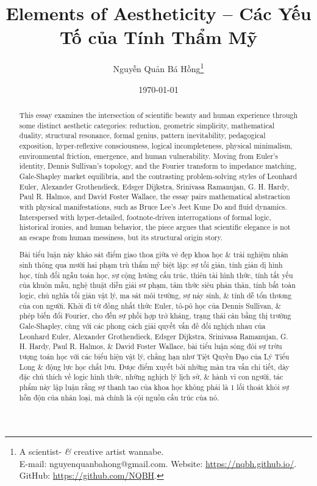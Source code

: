 \documentclass[11pt]{article}
\title{Elements of Aestheticity -- Các Yếu Tố của Tính Thẩm Mỹ}
\author{Nguyễn Quản Bá Hồng\footnote{A scientist- {\it\&} creative artist wannabe.\\E-mail: {\sf nguyenquanbahong@gmail.com}. Website: \url{https://nqbh.github.io/}. GitHub: \url{https://github.com/NQBH}.}}
\date{\today}
\begin{document}
\maketitle
\begin{abstract}
This essay examines the intersection of scientific beauty and human experience through some distinct aesthetic categories: reduction, geometric simplicity, mathematical duality, structural resonance, formal genius, pattern inevitability, pedagogical exposition, hyper-reflexive consciousness, logical incompleteness, physical minimalism, environmental friction, emergence, and human vulnerability. Moving from Euler's identity, Dennis Sullivan's topology, and the Fourier transform to impedance matching, Gale-Shapley market equilibria, and the contrasting problem-solving styles of Leonhard Euler, Alexander Grothendieck, Edsger Dijkstra, Srinivasa Ramanujan, G. H. Hardy, Paul R. Halmos, and David Foster Wallace, the essay pairs mathematical abstraction with physical manifestations, such as Bruce Lee's Jeet Kune Do and fluid dynamics. Interspersed with hyper-detailed, footnote-driven interrogations of formal logic, historical ironies, and human behavior, the piece argues that scientific elegance is not an escape from human messiness, but its structural origin story.

Bài tiểu luận này khảo sát điểm giao thoa giữa vẻ đẹp khoa học \& trải nghiệm nhân sinh thông qua mười hai phạm trù thẩm mỹ biệt lập: sự tối giản, tính giản dị hình học, tính đối ngẫu toán học, sự cộng hưởng cấu trúc, thiên tài hình thức, tính tất yếu của khuôn mẫu, nghệ thuật diễn giải sư phạm, tâm thức siêu phản thân, tính bất toàn logic, chủ nghĩa tối giản vật lý, ma sát môi trường, sự nảy sinh, \& tính dễ tổn thương của con người. Khởi đi từ đồng nhất thức Euler, tô-pô học của Dennis Sullivan, \& phép biến đổi Fourier, cho đến sự phối hợp trở kháng, trạng thái cân bằng thị trường Gale-Shapley, cùng với các phong cách giải quyết vấn đề đối nghịch nhau của Leonhard Euler, Alexander Grothendieck, Edsger Dijkstra, Srinivasa Ramanujan, G. H. Hardy, Paul R. Halmos, \& David Foster Wallace, bài tiểu luận sóng đôi sự trừu tượng toán học với các biểu hiện vật lý, chẳng hạn như Tiệt Quyền Đạo của Lý Tiểu Long \& động lực học chất lưu. Được điểm xuyết bởi những màn tra vấn chi tiết, dày đặc chú thích về logic hình thức, những nghịch lý lịch sử, \& hành vi con người, tác phẩm này lập luận rằng sự thanh tao của khoa học không phải là 1 lối thoát khỏi sự hỗn độn của nhân loại, mà chính là cội nguồn cấu trúc của nó.
\end{abstract}
\tableofcontents
\end{document}

